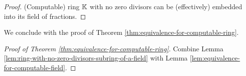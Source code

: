 \begin{proof}
	(Computable) ring ${\mathbb K}$ with no zero divisors can be (effectively) embedded into its field of fractions.
\end{proof}
We conclude with the proof of Theorem \ref{thm:equivalence-for-computable-ring}.
\begin{proof}[Proof of Theorem \ref{thm:equivalence-for-computable-ring}]
	Combine Lemma \ref{lem:ring-with-no-zero-divisors-subring-of-a-field} with Lemma \ref{lem:equivalence-for-computable-field}.
\end{proof}

